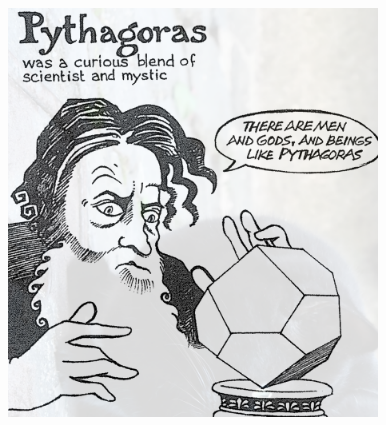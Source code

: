 \documentclass[unicode, 14pt, aspectratio=169]{beamer}
\begin{document}
\begin{frame}
\begin{columns}
\begin{column}{0.25\textwidth}
\begin{center}
    \end{center}
  \end{column}
  \begin{column}{0.25\textwidth}  %
    \begin{center}
      \includegraphics[width=0.8\textwidth]{images/pythagoras.png}
    \end{center}
  \end{column}
  \begin{column}{0.25\textwidth}  %
    \begin{center}

\end{center}
\end{column}
\end{columns}
\end{frame}
\end{document}
